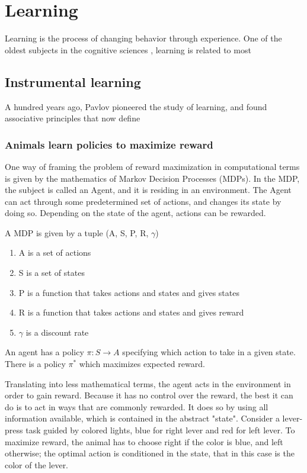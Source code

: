 \chapter{Learning}
    Learning is the process of changing behavior through experience. One of the oldest subjects in the cognitive sciences \cite{}, learning is related to most 
    
\section{Instrumental learning}
    
    A hundred years ago, Pavlov \cite{} pioneered the study of learning, and found associative principles that now define 
    
    \subsection{Animals learn policies to maximize reward}
        One way of framing the problem of reward maximization in computational terms is given by the mathematics of Markov Decision Processes (MDPs). In the MDP, the subject is called an Agent, and it is residing in an environment. The Agent can act through some predetermined set of actions, and changes its state by doing so. Depending on the state of the agent, actions can be rewarded.
        
        A MDP is given by a tuple (A, S, P, R, $\gamma$)
        \begin{enumerate}
            \item A is a set of actions
            \item S is a set of states
            \item P is a function that takes actions and states and gives states
            \item R is a function that takes actions and states and gives reward
            \item $\gamma$ is a discount rate
        \end{enumerate}
        
        An agent has a policy $\pi : S \rightarrow A $ specifying which action to take in a given state.
        There is a policy $\pi^*$ which maximizes expected reward.
        
        Translating into less mathematical terms, the agent acts in the environment in order to gain reward. Because it has no control over the reward, the best it can do is to act in ways that are commonly rewarded. It does so by using all information available, which is contained in the abstract "state". Consider a lever-press task guided by colored lights, blue for right lever and red for left lever. To maximize reward, the animal has to choose right if the color is blue, and left otherwise; the optimal action is conditioned in the state, that in this case is the color of the lever. 
        
